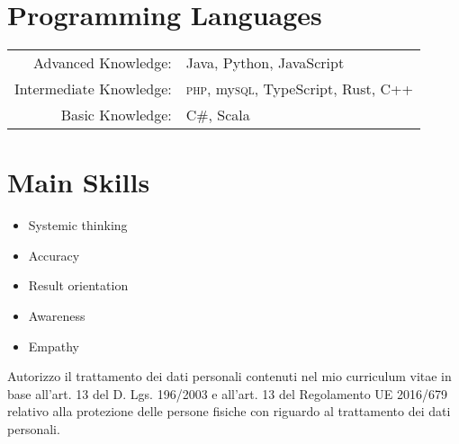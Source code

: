 \documentclass[a4paper,10pt]{article}
\begin{document}
\section{Programming Languages}
\begin{tabular}{rl}
 Advanced Knowledge:& Java, Python, JavaScript \\
 Intermediate Knowledge:& \textsc{php}, my\textsc{sql}, TypeScript, Rust, C++ \\
 Basic Knowledge:& C\#, Scala \\
\end{tabular}

\section{Main Skills}
\begin{itemize}
	\itemsep -0.5em 
	\item Systemic thinking
	\item Accuracy
	\item Result orientation
	\item Awareness
	\item Empathy
\end{itemize}
\vspace{2cm}
Autorizzo il trattamento dei dati personali contenuti nel mio curriculum vitae in base all’art. 13 del D. Lgs. 196/2003 e all’art. 13 del Regolamento UE 2016/679 relativo alla protezione delle persone fisiche con riguardo al trattamento dei dati personali.

%
\end{document}
